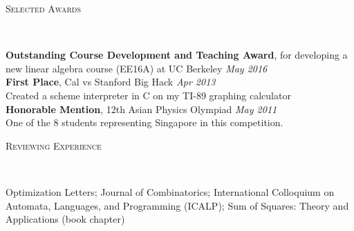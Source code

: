 \documentclass[9pt]{article}
\newenvironment{changemargin}[2]{%
  \begin{list}{}{%
      \setlength{\topsep}{0pt}%
      \setlength{\leftmargin}{#1}%
      \setlength{\rightmargin}{#2}%
      \setlength{\listparindent}{\parindent}%
      \setlength{\itemindent}{\parindent}%
      \setlength{\parsep}{\parskip}%
    }%
  \item[]}{\end{list}
}
\newcommand{\lineover}{
  \begin{changemargin}{-0.05in}{-0.05in}
    \vspace*{-8pt}
    \hrulefill \\
    \vspace*{-2pt}
  \end{changemargin}
}
\newcommand{\header}[1]{
  \begin{changemargin}{-0.5in}{-0.5in}
    \scshape{#1}\\
    \lineover
  \end{changemargin}
}
\newenvironment{body} {
  \vspace*{-16pt}
  \begin{changemargin}{-0.25in}{-0.5in}
  }
  {\end{changemargin}
}
\begin{document}
\header{Selected Awards}
\begin{body}
  \vspace{14pt}
  \textbf{Outstanding Course Development and Teaching Award}, for developing
  a new linear algebra course (EE16A) at UC Berkeley \hfill{} \emph{May 2016}\\
  \smallskip
  \textbf{First Place}, Cal vs Stanford Big Hack \hfill{} \emph{Apr 2013}\\
  Created a scheme interpreter in C on my TI-89 graphing calculator \\
  \smallskip
  \textbf{Honorable Mention}, 12th Asian Physics Olympiad \hfill{} \emph{May 2011}\\
  One of the 8 students representing Singapore in this competition.\\
\end{body}

\smallskip

\header{Reviewing Experience}
\begin{body}
  \vspace{14pt} Optimization Letters; Journal of Combinatorics; International
  Colloquium on Automata, Languages, and Programming (ICALP); Sum of Squares:
  Theory and Applications (book chapter)
\end{body}
\smallskip
\end{document}
